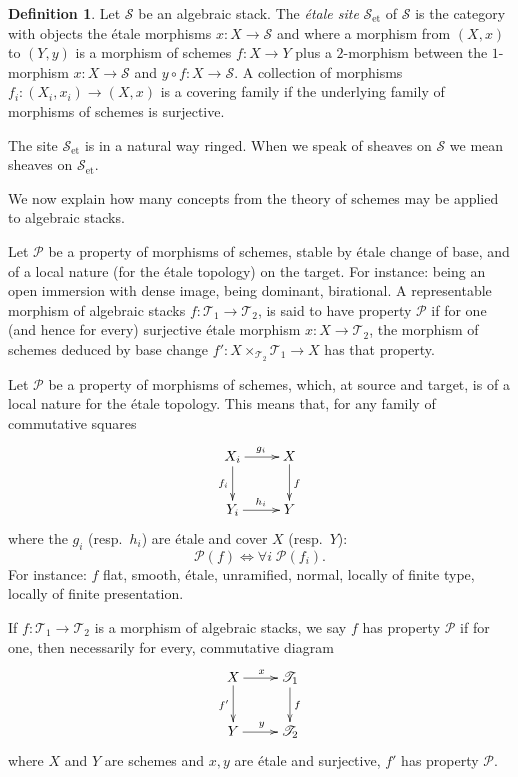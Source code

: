 \documentclass[10pt]{amsart}
\theoremstyle{plain}
\theoremstyle{definition}
\newtheorem{definition}[theorem]{Definition}
\DeclareMathOperator{\et}{et}
\begin{document}
\begin{definition}\label{def:4.10}
Let $\mathscr{S}$ be an algebraic stack. The \emph{\'etale site} $\mathscr{S}_{\et}$ of $\mathscr{S}$ is the category with objects the \'etale morphisms $x: X \to \mathscr{S}$ and where a morphism from $(X, x)$ to $(Y, y)$ is a morphism of schemes $f: X \to Y$ plus a $2$-morphism between the $1$-morphism $x: X \to \mathscr{S}$ and $y \circ f: X \to \mathscr{S}$. A collection of morphisms $f_i: (X_i, x_i) \to (X, x)$ is a covering family if the underlying family of morphisms of schemes is surjective.
\end{definition}

The site $\mathscr{S}_{\et}$ is in a natural way ringed. When we speak of sheaves on $\mathscr{S}$ we mean sheaves on $\mathscr{S}_{\et}$.

We now explain how many concepts from the theory of schemes may be applied to algebraic stacks.

Let $\mathscr{P}$ be a property of morphisms of schemes, stable by \'etale change of base, and of a local nature (for the \'etale topology) on the target. For instance: being an open immersion with dense image, being dominant, birational. A representable morphism of algebraic stacks $f: \mathscr{T}_1 \to \mathscr{T}_2$, is said to have property $\mathscr{P}$ if for one (and hence for every) surjective \'etale morphism $x: X \to \mathscr{T}_2$, the morphism of schemes deduced by base change $f': X \times_{\mathscr{T}_2} \mathscr{T}_1 \to X$ has that property.

Let $\mathscr{P}$ be a property of morphisms of schemes, which, at source and target, is of a local nature for the \'etale topology. This means that, for any family of commutative squares
\[
\xymatrix{
X_i \ar[r]^{g_i} \ar[d]_{f_i} & X \ar[d]^f \\
Y_i \ar[r]^{h_i} & Y
}
\]
where the $g_i$ (resp.~$h_i$) are \'etale and cover $X$ (resp.~$Y$):
\[
\mathscr{P}(f) \Leftrightarrow \forall i \; \mathscr{P}(f_i).
\]
For instance: $f$ flat, smooth, \'etale, unramified, normal, locally of finite type, locally of finite presentation.

If $f: \mathscr{T}_1 \to \mathscr{T}_2$ is a morphism of algebraic stacks, we say $f$ has property $\mathscr{P}$ if for one, then necessarily for every, commutative diagram
\[
\xymatrix{
X \ar[r]^x \ar[d]_{f'} & \mathscr{T}_1 \ar[d]^f \\
Y \ar[r]^y & \mathscr{T}_2
}
\]
where $X$ and $Y$ are schemes and $x, y$ are \'etale and surjective, $f'$ has property $\mathscr{P}$.
\end{document}

